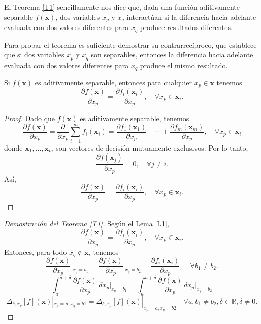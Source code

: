 El Teorema \ref{T1} sencillamente nos dice que, dada una función aditivamente separable \( f(\mathbf{x}) \), dos variables \( x_p \) y \( x_q \) interactúan si la diferencia hacia adelante evaluada con dos valores diferentes para \( x_q \) produce resultados diferentes.

Para probar el teorema es suficiente demostrar su contrarrecíproco, que establece que si dos variables \( x_p \) y \( x_q \) son separables, entonces la diferencia hacia adelante evaluada con dos valores diferentes para \( x_q \) produce el mismo resultado.


\begin{lema}
\label{L1}
Si \( f(\mathbf{x}) \) es aditivamente separable, entonces para cualquier \( x_p \in \mathbf{x} \) tenemos
\[
\frac{\partial f(\mathbf{x})}{\partial x_p} = \frac{\partial f_i(\mathbf{x}_i)}{\partial x_p}, \quad \forall x_p \in \mathbf{x}_i.
\]
\end{lema}

\begin{proof}
Dado que \( f(\mathbf{x}) \) es aditivamente separable, tenemos
\[
\frac{\partial f(\mathbf{x})}{\partial x_p} = \frac{\partial}{\partial x_p} \sum_{i=1}^{m} f_i(\mathbf{x}_i) = \frac{\partial f_1(\mathbf{x}_1)}{\partial x_p} + \cdots + \frac{\partial f_m(\mathbf{x}_m)}{\partial x_p}, \quad \forall x_p \in \mathbf{x}_i
\]
donde \( \mathbf{x}_1, \ldots, \mathbf{x}_m \) son vectores de decisión mutuamente exclusivos. Por lo tanto,
\[
\frac{\partial f(\mathbf{x}_j)}{\partial x_p} = 0, \quad \forall j \neq i.
\]
Así,
\[
\frac{\partial f(\mathbf{x})}{\partial x_p} = \frac{\partial f_i(\mathbf{x}_i)}{\partial x_p}, \quad \forall x_p \in \mathbf{x}_i.
\]
\end{proof}

\begin{proof}[Demostración del Teorema \ref{T1}]
Según el Lema \ref{L1},
\[
\frac{\partial f(\mathbf{x})}{\partial x_p} = \frac{\partial f_i(\mathbf{x}_i)}{\partial x_p}, \quad \forall x_p \in \mathbf{x}_i.
\]
Entonces, para todo \( x_q \notin \mathbf{x}_i \) tenemos
\[
\frac{\partial f(\mathbf{x})}{\partial x_p} \bigg|_{x_q=b_1} = \frac{\partial f(\mathbf{x})}{\partial x_p} \bigg|_{x_q=b_2} = \frac{\partial f_i(\mathbf{x}_i)}{\partial x_p}, \quad \forall b_1 \neq b_2.
\]
\[
\int_{a}^{a+\delta} \frac{\partial f(\mathbf{x})}{\partial x_p} \, dx_p \bigg|_{x_q=b_1} = \int_{a}^{a+\delta} \frac{\partial f(\mathbf{x})}{\partial x_p} \, dx_p \bigg|_{x_q=b_2}
\]
\[
\Delta_{\delta,x_p}[f](\mathbf{x})|_{x_p=a, x_q=b1} = \Delta_{\delta,x_p}[f](\mathbf{x})|_{x_p=a, x_q=b2} \quad \forall a, b_1 \neq b_2, \delta \in \mathbb{R}, \delta \neq 0.
\]
\end{proof}



\endinput
